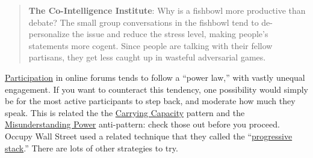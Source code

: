 \begin{quote}
\textbf{The Co-Intelligence Institute}: Why is a fishbowl more
productive than debate? The small group conversations in the fishbowl
tend to de-personalize the issue and reduce the stress level, making
people's statements more cogent. Since people are talking with their
fellow partisans, they get less caught up in wasteful adversarial games.
\end{quote}
\href{http://peeragogy.org/organizing-a-learning-context/participation/}{Participation}
in online forums tends to follow a ``power law,'' with vastly unequal
engagement. If you want to counteract this tendency, one possibility
would simply be for the most active participants to step back, and
moderate how much they speak. This is related the the
\href{http://peeragogy.org/patterns-usecases/patterns-and-heuristics/carrying-capacity/}{Carrying
Capacity} pattern and the
\href{http://peeragogy.org/practice/antipatterns/misunderstanding-power/}{Misunderstanding
Power} anti-pattern: check those out before you proceed. Occupy Wall
Street used a related technique that they called the
``\href{http://en.wikipedia.org/wiki/Progressive\_stack}{progressive
stack}.'' There are lots of other strategies to try.

